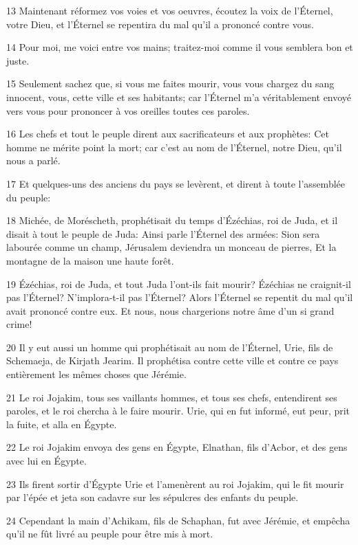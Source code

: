 \par 13 Maintenant réformez vos voies et vos oeuvres, écoutez la voix de l'Éternel, votre Dieu, et l'Éternel se repentira du mal qu'il a prononcé contre vous.
\par 14 Pour moi, me voici entre vos mains; traitez-moi comme il vous semblera bon et juste.
\par 15 Seulement sachez que, si vous me faites mourir, vous vous chargez du sang innocent, vous, cette ville et ses habitants; car l'Éternel m'a véritablement envoyé vers vous pour prononcer à vos oreilles toutes ces paroles.
\par 16 Les chefs et tout le peuple dirent aux sacrificateurs et aux prophètes: Cet homme ne mérite point la mort; car c'est au nom de l'Éternel, notre Dieu, qu'il nous a parlé.
\par 17 Et quelques-uns des anciens du pays se levèrent, et dirent à toute l'assemblée du peuple:
\par 18 Michée, de Moréscheth, prophétisait du temps d'Ézéchias, roi de Juda, et il disait à tout le peuple de Juda: Ainsi parle l'Éternel des armées: Sion sera labourée comme un champ, Jérusalem deviendra un monceau de pierres, Et la montagne de la maison une haute forêt.
\par 19 Ézéchias, roi de Juda, et tout Juda l'ont-ils fait mourir? Ézéchias ne craignit-il pas l'Éternel? N'implora-t-il pas l'Éternel? Alors l'Éternel se repentit du mal qu'il avait prononcé contre eux. Et nous, nous chargerions notre âme d'un si grand crime!
\par 20 Il y eut aussi un homme qui prophétisait au nom de l'Éternel, Urie, fils de Schemaeja, de Kirjath Jearim. Il prophétisa contre cette ville et contre ce pays entièrement les mêmes choses que Jérémie.
\par 21 Le roi Jojakim, tous ses vaillants hommes, et tous ses chefs, entendirent ses paroles, et le roi chercha à le faire mourir. Urie, qui en fut informé, eut peur, prit la fuite, et alla en Égypte.
\par 22 Le roi Jojakim envoya des gens en Égypte, Elnathan, fils d'Acbor, et des gens avec lui en Égypte.
\par 23 Ils firent sortir d'Égypte Urie et l'amenèrent au roi Jojakim, qui le fit mourir par l'épée et jeta son cadavre sur les sépulcres des enfants du peuple.
\par 24 Cependant la main d'Achikam, fils de Schaphan, fut avec Jérémie, et empêcha qu'il ne fût livré au peuple pour être mis à mort.

